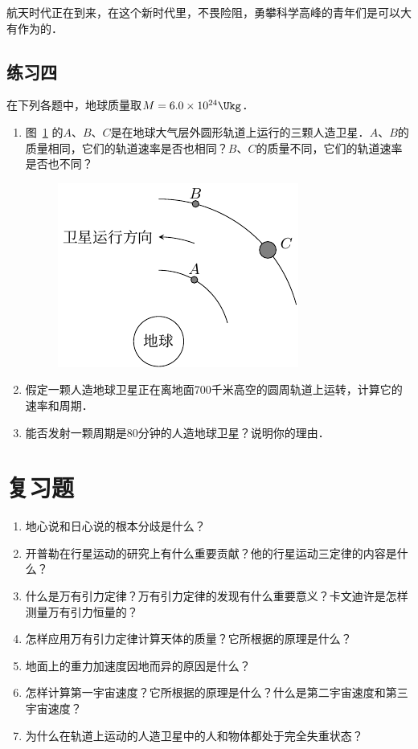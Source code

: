 航天时代正在到来，在这个新时代里，不畏险阻，勇攀科学高峰的青年们是可以大有作为的．	
	
\subsection*{练习四}

在下列各题中，地球质量取$M=6.0\times 10^{24} \Ukg$．
\begin{enumerate}
	\item 图~\ref{fig_A_5-8}  的$A$、$B$、$C$是在地球大气层外圆形轨道上运行的三颗人造卫星．$A$、$B$的质量相同，它们的轨道速率是否也相同？$B$、$C$的质量不同，它们的轨道速率是否也不同？

\begin{figure}[htbp]
	\centering
	\includegraphics{fig/A/5-8.pdf}
	\caption{}\label{fig_A_5-8}
\end{figure}

\item  假定一颗人造地球卫星正在离地面700千米高空的圆周轨道上运转，计算它的速率和周期．
\item 能否发射一颗周期是80分钟的人造地球卫星？说明你的理由．
\end{enumerate}
	
\section*{复习题}
\begin{enumerate}
	\item 地心说和日心说的根本分歧是什么？
	\item 开普勒在行星运动的研究上有什么重要贡献？他的行星运动三定律的内容是什么？
	\item 什么是万有引力定律？万有引力定律的发现有什么重要意义？卡文迪许是怎样测量万有引力恒量的？
	\item 怎样应用万有引力定律计算天体的质量？它所根据的原理是什么？
	\item 地面上的重力加速度因地而异的原因是什么？
	\item 怎样计算第一宇宙速度？它所根据的原理是什么？什么是第二宇宙速度和第三宇宙速度？
	\item 为什么在轨道上运动的人造卫星中的人和物体都处于完全失重状态？
\end{enumerate}

